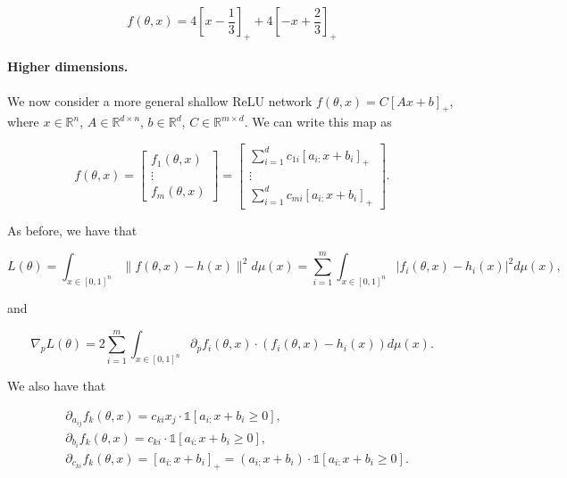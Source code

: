 \documentclass{article}
\newcommand{\RR}{\mathbb{R}}
\begin{document}
\[
f(\theta,x) = 4 \left[ x - \frac 1 3 \right]_+ + 4 \left[ - x + \frac 2 3
\right]_+
\]

\paragraph{Higher dimensions.} We now consider a more general shallow ReLU
network $f(\theta,x) = C[Ax + b]_+$, where $x \in \RR^n$, $A \in \RR^{d \times
n}$, $b \in \RR^d$, $C \in \RR^{m \times d}$. We can write this map
as 

\begin{equation}
f(\theta,x) = \begin{bmatrix} f_1(\theta,x) \\
\vdots \\
f_m(\theta,x)
\end{bmatrix} =  \begin{bmatrix} \sum_{i=1}^d c_{1i} [a_{i:} x + b_i]_+\\
    \vdots\\
    \sum_{i=1}^d c_{mi} [a_{i:} x + b_i]_+
\end{bmatrix}.
\end{equation}

As before, we have that

\begin{equation}\label{eq:loss_uniform_ndim}
L(\theta) = \int_{x \in [0,1]^n} \|f(\theta,x) - h(x)\|^2 d\mu(x) = 
\sum_{i=1}^m \int_{x \in [0,1]^n} |f_i(\theta,x) - h_i(x)|^2 d\mu(x),
\end{equation}

and

\begin{equation}\label{eq:gradient_ndim}
\nabla_p L(\theta) = 2 \sum_{i=1}^m \int_{x \in [0,1]^n} \partial_p f_i
(\theta,x)
\cdot (f_i(\theta,x)-h_i(x)) d\mu(x).
\end{equation}


We also have that 

\begin{equation}\label{eq:gradients_params_ndim}
\begin{aligned}
& \partial_{a_{ij}} f_k(\theta,x) = c_{ki} x_j \cdot \mathds{1}
[a_{i:} x
+ b_i \ge 0],\\
& \partial_{b_i} f_k(\theta,x) = c_{ki} \cdot \mathds{1}
[a_{i:} x
+ b_i \ge 0],\\ & \partial_{c_{ki}} f_k(\theta,x) = [a_{i:} x + b_i]_+ =
  (a_{i:} x + b_i) \cdot
\mathds{1} [a_{i:} x + b_i \ge 0].\\
\end{aligned}
\end{equation}
\end{document}
